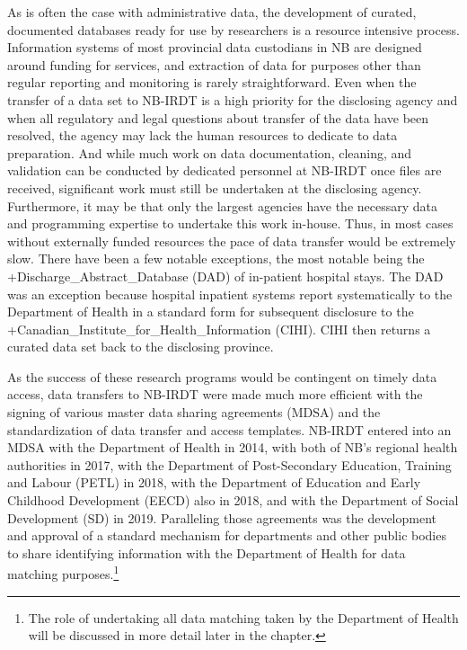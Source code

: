 \documentclass[
]{WileySix}
\begin{document}
As is often the case with administrative data, the development of curated, documented databases ready for use by researchers is a resource intensive process. Information systems of most provincial data custodians in NB are designed around funding for services, and extraction of data for purposes other than regular reporting and monitoring is rarely straightforward. Even when the transfer of a data set to NB-IRDT is a high priority for the disclosing agency and when all regulatory and legal questions about transfer of the data have been resolved, the agency may lack the human resources to dedicate to data preparation. And while much work on data documentation, cleaning, and validation can be conducted by dedicated personnel at NB-IRDT once files are received, significant work must still be undertaken at the disclosing agency. Furthermore, it may be that only the largest agencies have the necessary data and programming expertise to undertake this work in-house. Thus, in most cases without externally funded resources the pace of data transfer would be extremely slow. There have been a few notable exceptions, the most notable being the +Discharge\_Abstract\_Database\textbar{} (DAD) of in-patient hospital stays. The DAD was an exception because hospital inpatient systems report systematically to the Department of Health in a standard form for subsequent disclosure to the +Canadian\_Institute\_for\_Health\_Information\textbar{} (CIHI). CIHI then returns a curated data set back to the disclosing province.

As the success of these research programs would be contingent on timely data access, data transfers to NB-IRDT were made much more efficient with the signing of various master data sharing agreements (MDSA) and the standardization of data transfer and access templates. NB-IRDT entered into an MDSA with the Department of Health in 2014, with both of NB's regional health authorities in 2017, with the Department of Post-Secondary Education, Training and Labour (PETL) in 2018, with the Department of Education and Early Childhood Development (EECD) also in 2018, and with the Department of Social Development (SD) in 2019. Paralleling those agreements was the development and approval of a standard mechanism for departments and other public bodies to share identifying information with the Department of Health for data matching purposes.\footnote{The role of undertaking all data matching taken by the Department of Health will be discussed in more detail later in the chapter.}
\end{document}
